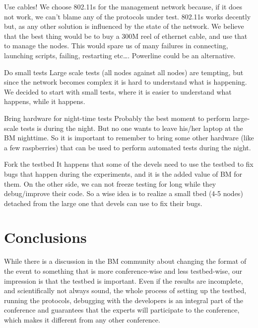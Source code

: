 \documentclass[10pt,onecolumn]{paper}
\begin{document}
\begin{mybox}{Use cables!}
    We choose 802.11s for the management network because, if it does not work,
    we can't blame any of the protocols under test. 802.11s works decently but,
    as any other solution is influenced by the state of the network. We believe
    that the best thing would be to buy a 300M reel of ethernet cable, and use
    that to manage the nodes. This would spare us of many failures in
    connecting, launching scripts, failing, restarting etc\ldots. Powerline
    could be an alternative.
\end{mybox}
\begin{mybox}{Do small tests}
    Large scale tests (all nodes against all nodes) are tempting, but since the
    network becomes complex it is hard to understand what is happening. We
    decided to start with small tests, where it is easier to understand what
    happens, while it happens. 
\end{mybox}
\begin{mybox}{Bring hardware for night-time tests}
    Probably the best moment to perform large-scale tests is during the night.
    But no one wants to leave his/her laptop at the BM nighttime. So it is
    important to remember to bring some other hardware (like a few raspberries)
    that can be used to perform automated tests during the night. 
\end{mybox}

\begin{mybox}{Fork the testbed}
    It happens that some of the devels need to use the testbed to fix bugs that
    happen during the experiments, and it is the added value of BM for them. On
    the other side, we can not freeze testing for long while they debug/improve
    their code. So a wise idea is to realize a small tbed (4-5 nodes) detached
    from the large one that devels can use to fix their bugs. 
\end{mybox}


\section{Conclusions}
While there is a discussion in the BM community about changing the format of the event
to something that is more conference-wise and less testbed-wise, our
impression is that the testbed is important. Even if the results are
incomplete, and scientifically not always sound, the whole process of
setting up the testbed, running the protocols, debugging with the developers
is an integral part of the conference and guarantees that the experts will
participate to the conference, which makes it different from any other
conference. 



%
%
\end{document}
